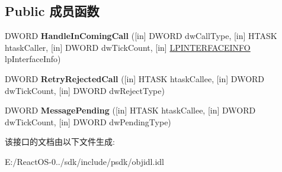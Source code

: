 \subsection*{Public 成员函数}
\begin{DoxyCompactItemize}
\item 
\mbox{\label{interface_i_message_filter_a718942d091b7cdac8620a3384c50d52b}} 
D\+W\+O\+RD {\bfseries Handle\+In\+Coming\+Call} (\mbox{[}in\mbox{]} D\+W\+O\+RD dw\+Call\+Type, \mbox{[}in\mbox{]} H\+T\+A\+SK htask\+Caller, \mbox{[}in\mbox{]} D\+W\+O\+RD dw\+Tick\+Count, \mbox{[}in\mbox{]} \hyperlink{struct_i_message_filter_1_1tag_i_n_t_e_r_f_a_c_e_i_n_f_o}{L\+P\+I\+N\+T\+E\+R\+F\+A\+C\+E\+I\+N\+FO} lp\+Interface\+Info)
\item 
\mbox{\label{interface_i_message_filter_afb165582b2a82b95472f98307962a0d8}} 
D\+W\+O\+RD {\bfseries Retry\+Rejected\+Call} (\mbox{[}in\mbox{]} H\+T\+A\+SK htask\+Callee, \mbox{[}in\mbox{]} D\+W\+O\+RD dw\+Tick\+Count, \mbox{[}in\mbox{]} D\+W\+O\+RD dw\+Reject\+Type)
\item 
\mbox{\label{interface_i_message_filter_a555e9df03344c99a2bd938d8998e3a0c}} 
D\+W\+O\+RD {\bfseries Message\+Pending} (\mbox{[}in\mbox{]} H\+T\+A\+SK htask\+Callee, \mbox{[}in\mbox{]} D\+W\+O\+RD dw\+Tick\+Count, \mbox{[}in\mbox{]} D\+W\+O\+RD dw\+Pending\+Type)
\end{DoxyCompactItemize}


该接口的文档由以下文件生成\+:\begin{DoxyCompactItemize}
\item 
E\+:/\+React\+O\+S-\/0../sdk/include/psdk/objidl.\+idl\end{DoxyCompactItemize}
